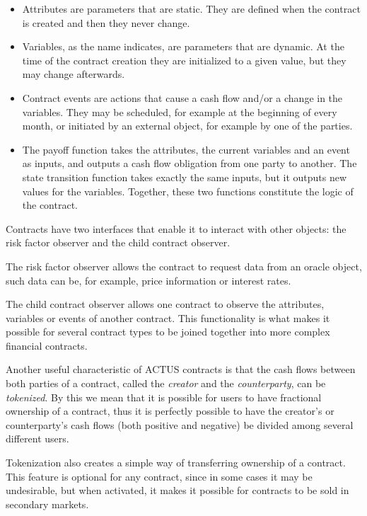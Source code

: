 \documentclass[conference]{IEEEtran}
\begin{document}
\begin{itemize}
	\item Attributes are parameters that are static. They are defined when the contract is created and then they never change.
	\item Variables, as the name indicates, are parameters that are dynamic. At the time of the contract creation they are initialized to a given value, but they may change afterwards.
	\item Contract events are actions that cause a cash flow and/or a change in the variables. They may be scheduled, for example at the beginning of every month, or initiated by an external object, for example by one of the parties.
	\item The payoff function takes the attributes, the current variables and an event as inputs, and outputs a cash flow obligation from one party to another. The state transition function takes exactly the same inputs, but it outputs new values for the variables. Together, these two functions constitute the logic of the contract.
\end{itemize}

Contracts have two interfaces that enable it to interact with other objects: the risk factor observer and the child contract observer.

The risk factor observer allows the contract to request data from an oracle object, such data can be, for example, price information or interest rates.

The child contract observer allows one contract to observe the attributes, variables or events of another contract. This functionality is what makes it possible for several contract types to be joined together into more complex financial contracts.

Another useful characteristic of ACTUS contracts is that the cash flows between both parties of a contract, called the \textit{creator} and the \textit{counterparty}, can be \textit{tokenized}. By this we mean that it is possible for users to have fractional ownership of a contract, thus it is perfectly possible to have the creator's or counterparty's cash flows (both positive and negative) be divided among several different users.

Tokenization also creates a simple way of transferring ownership of a contract. This feature is optional for any contract, since in some cases it may be undesirable, but when activated, it makes it possible for contracts to be sold in secondary markets.
\end{document}
